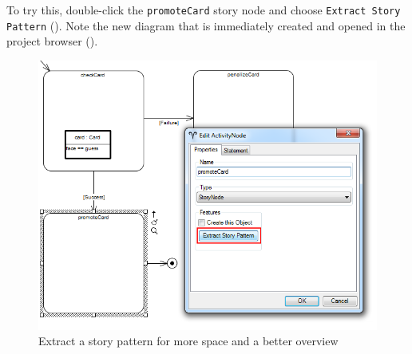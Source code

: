 \begin{stepbystep}

\item To try this, double-click the \texttt{promoteCard} story node and choose \texttt{Ext\-ract Story Pattern}
(). Note the new diagram that is immediately created and opened in the project browser
().

\begin{figure}[htbp]
\begin{center}
  \includegraphics[width=1.1\textwidth]{../../org.moflon.doc.handbook.03_storyDiagrams/04_checkCard/visCheImages/ea_extractStoryPattern}
  \caption{Extract a story pattern for more space and a better overview}
  \label{ea:sdm_check_extract_storypattern}
\end{center}
\end{figure}


\end{stepbystep}
